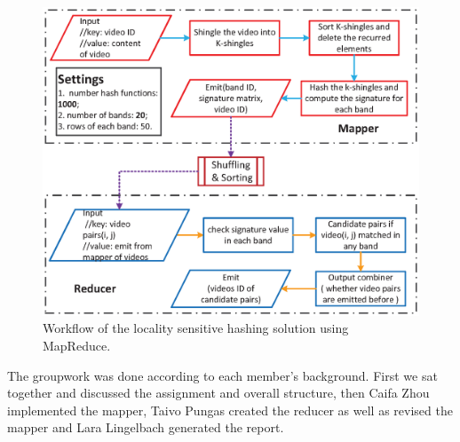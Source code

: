\documentclass[a4paper, 11pt]{article}
\begin{document}
\begin{figure}[!htb]
\centering
\includegraphics[scale=.7]{workflow_project_1.eps}
\caption{Workflow of the locality sensitive hashing solution using MapReduce.}
\label{fig: Digraph}
\end{figure}

The groupwork was done according to each member's background. First we sat together and discussed the assignment and overall structure, then Caifa Zhou implemented the mapper, Taivo Pungas created the reducer as well as revised the mapper and Lara Lingelbach generated the report. 
\end{document}
